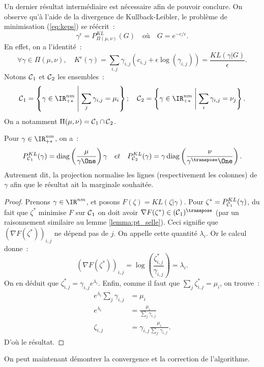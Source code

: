 Un dernier résultat intermédiaire est nécessaire afin de pouvoir conclure. On observe qu'à l'aide de la divergence de Kullback-Leibler, le problème de minimisation (\ref{eq:keps}) se réécrit~:
\[
\gamma^\epsilon = P^{KL}_{\Pi(\mu,\nu)} (G)
\quad \text{où} \quad G = e^{-c/\epsilon} .
\]
En effet, on a l'identité~:
\[
\forall \gamma \in \Pi(\mu,\nu), 
\quad K^\epsilon(\gamma) 
= \sum_{i,j} \gamma_{i,j} (c_{i,j} + \epsilon \log(\gamma_{i,j}))
= \frac{KL(\gamma | G)}{\epsilon} .
\]
Notons $\operatorname{\mathcal{C}}_1$ et $\operatorname{\mathcal{C}}_2$ les ensembles~:
\[
\Ccal_1 = \left\{ \gamma \in \IR_{+*}^{nm} \;\middle|\; \sum_j \gamma_{i,j} = \mu_i \right\}
; \quad
\Ccal_2 = \left\{ \gamma \in \IR_{+*}^{nm} \;\middle|\; \sum_i \gamma_{i,j} = \nu_j \right\} .
\]
On a notamment $\Pi(\mu,\nu) = \operatorname{\mathcal{C}}_1 \cap \operatorname{\mathcal{C}}_2$.
\begin{lemma}\label{lemma:pkl_c1c2}
Pour $\gamma \in \IR_{+*}^{nm}$, on a~:
\begin{equation}
P^{KL}_{\Ccal_1} (\gamma) = \diag \left(\frac{\mu}{\gamma \One} \right) \gamma
\quad et \quad
P^{KL}_{\Ccal_2} (\gamma) = \gamma \diag \left(\frac{\nu}{\gamma^\transpose \One} \right)
.
\end{equation}
Autrement dit, la projection normalise les lignes (respectivement les colonnes) de $\gamma$ afin que le résultat ait la marginale souhaitée.
\end{lemma}
\begin{proof}
Prenons $\gamma \in \IR^{nm}$, et posons $F(\zeta) = KL(\zeta | \gamma)$. Pour $\zeta^* = P^{KL}_{\operatorname{\mathcal{C}}_1} (\gamma)$, du fait que $\zeta^*$ minimise $F$ sur $\operatorname{\mathcal{C}}_1$ on doit avoir $\nabla F (\zeta^*) \in (\Ccal_1)^\transpose$ (par un raisonnement similaire au lemme \ref{lemma:pt_selle}). Ceci signifie que $(\nabla F (\zeta^*))_{i,j}$ ne dépend pas de $j$. On appelle cette quantité $\lambda_i$. Or le calcul donne~:
\[
\left(\nabla F (\zeta^*)\right) _{i,j} = \log \left(\frac{\zeta^*_{i,j}}{\gamma_{i,j}} \right) = \lambda_i .
\]
On en déduit que $\zeta^*_{i,j} = \gamma_{i,j} e^{\lambda_i}$. Enfin, comme il faut que $\sum_{j} \zeta^*_{i,j} = \mu_i$, on trouve~:
\[\begin{split}
e^{\lambda_i} \sum_j \gamma_{i,j} &= \mu_i \\
e^{\lambda_i} &= \frac{\mu_i}{\sum_{j} \gamma_{i,j}} \\
\zeta_{i,j} &= \gamma_{i,j} \frac{\mu_i}{\sum_{j'} \gamma_{i,j'}} .
\end{split}\]
D'où le résultat.
\end{proof}
On peut maintenant démontrer la convergence et la correction de l'algorithme.
